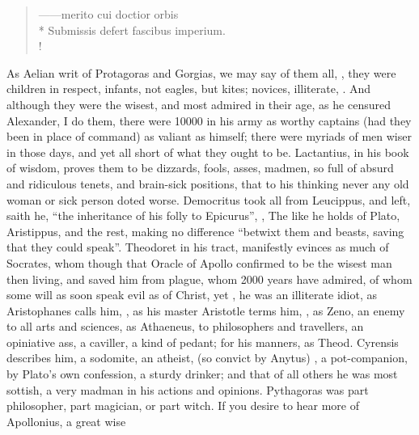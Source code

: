 \begin{latin}
\begin{verse}%
------merito cui doctior orbis\\*
Submissis defert fascibus imperium.\\!
\end{verse}%
\end{latin}

As Aelian writ of Protagoras and Gorgias, we may say of them all, , they were children in respect,
infants, not eagles, but kites; novices, illiterate, .
And although they were the wisest, and most admired in their age, as he
censured Alexander, I do them, there were 10\thinspace{}000 in his army as
worthy captains (had they been in place of command) as valiant as himself;
there were myriads of men wiser in those days, and yet all short of what they
ought to be. Lactantius, in his book of wisdom, proves them
to be dizzards, fools, asses, madmen, so full of absurd and ridiculous tenets,
and brain-sick positions, that to his thinking never any old woman or sick
person doted worse. Democritus took all from Leucippus, and
left, saith he, \enquote{the inheritance of his folly to Epicurus},
, \etc{} The like he holds of
Plato, Aristippus, and the rest, making no difference
\enquote{betwixt them and beasts, saving that they could speak}.
Theodoret in his tract,  manifestly evinces as much of Socrates, whom though that Oracle of
Apollo confirmed to be the wisest man then living, and saved him from plague,
whom 2000 years have admired, of whom some will as soon speak evil as of
Christ, yet , he was an illiterate idiot, as
Aristophanes calls him, , as his
master Aristotle terms him, , as Zeno, an
enemy to all arts and sciences, as Athaeneus, to
philosophers and travellers, an opiniative ass, a caviller, a kind of pedant;
for his manners, as Theod. Cyrensis describes him, a
sodomite, an atheist, (so convict by Anytus) , \etc{} a pot-companion, by Plato's own
confession, a sturdy drinker; and that of all others he was most sottish, a
very madman in his actions and opinions. Pythagoras was part philosopher, part
magician, or part witch. If you desire to hear more of Apollonius, a great wise
